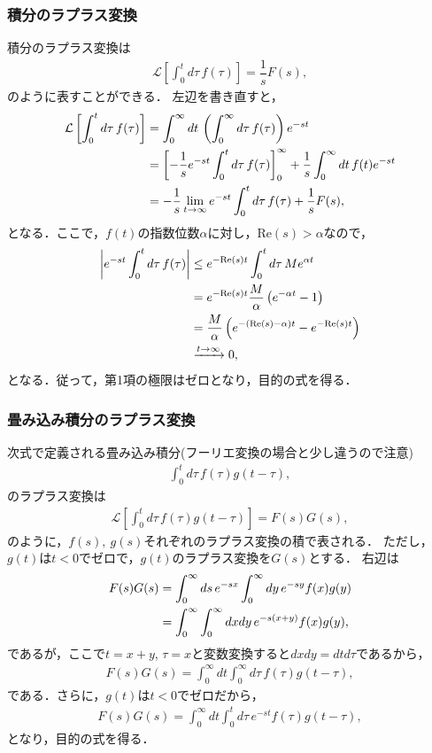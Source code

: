 \subsubsection{積分のラプラス変換}
%
積分のラプラス変換は
\begin{align}
  \mathcal{L}\left[\int_{0}^{t}d\tau\,f(\tau)\right] = \dfrac{1}{s}F(s),
\end{align}
のように表すことができる．
左辺を書き直すと，
\begin{align}
 \mathcal{L}\left[\int_{0}^{t}d\tau\, f(\tau)\right]
 &=\int_{0}^{\infty}dt\,\left(\int_{0}^{\infty}d\tau\,f(\tau)\right)e^{-st} \notag \\
 &=\left[-\dfrac{1}{s}e^{-st}\int_{0}^{t}d\tau\,f(\tau)\right]_{0}^{\infty} 
   +\dfrac{1}{s}\int_{0}^{\infty}dt\,f(t)e^{-st} \notag \\
 &=-\dfrac{1}{s}\lim_{t\to\infty}e^{-st}\int_{0}^{t}d\tau\,f(\tau) + \dfrac{1}{s}F(s), 
\end{align}
となる．ここで，$f(t)$の指数位数$\alpha$に対し，$\mathrm{Re}(s) > \alpha$なので，
\begin{align}
 \left|e^{-st}\int_{0}^{t}d\tau\, f(\tau)\right| 
 & \leq e^{-\mathrm{Re}(s)t}\int_{0}^{t}d\tau\, Me^{\alpha t} \notag \\
 & = e^{-\mathrm{Re}(s)t}\dfrac{M}{\alpha}\left(e^{-\alpha t}-1\right) \notag \\
 & = \dfrac{M}{\alpha}\left(e^{-(\mathrm{Re}(s)-\alpha)t}-e^{-\mathrm{Re}(s)t}\right) \notag \\
 & \xrightarrow{t\to \infty} 0,
\end{align}
となる．従って，第1項の極限はゼロとなり，目的の式を得る．
%
\subsubsection{畳み込み積分のラプラス変換}
%
次式で定義される畳み込み積分(フーリエ変換の場合と少し違うので注意)
\begin{align}
 \int_{0}^{t}d\tau\, f(\tau)g(t-\tau), 
\end{align}
のラプラス変換は
\begin{align}
 \mathcal{L}\left[\int_{0}^{t}d\tau\,f(\tau)g(t-\tau)\right] = F(s)G(s), 
\end{align}
のように，$f(s),~g(s)$それぞれのラプラス変換の積で表される．
ただし，$g(t)$は$t<0$でゼロで，$g(t)$のラプラス変換を$G(s)$とする．
右辺は
\begin{align}
 F(s)G(s) 
 &= \int_{0}^{\infty}ds\,e^{-sx}\int_{0}^{\infty}dy\, e^{-sy}f(x)g(y) \notag \\
 &= \int_{0}^{\infty}\int_{0}^{\infty}dxdy\,e^{-s(x+y)}f(x)g(y),
\end{align}
であるが，ここで$t=x+y$, $\tau=x$と変数変換すると$dxdy = dtd\tau$であるから，
\begin{align}
 F(s)G(s) = \int_{0}^{\infty}dt\int_{0}^{\infty}d\tau\,f(\tau)g(t-\tau), 
\end{align}
である．さらに，$g(t)$は$t<0$でゼロだから，
\begin{align}
 F(s)G(s) = \int_{0}^{\infty}dt\int_{0}^{t}d\tau\, e^{-st}f(\tau)g(t-\tau), 
\end{align}
となり，目的の式を得る．
%
